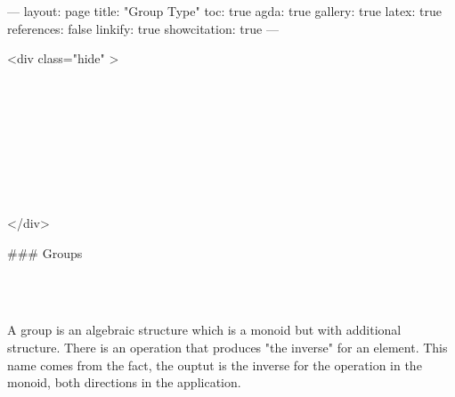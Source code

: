 ---
layout: page
title: "Group Type"
toc: true
agda: true
gallery: true
latex: true
references: false
linkify: true
showcitation: true
---

<div class="hide" >
\begin{code}%
\>[0]\AgdaSymbol{\{-\#}\AgdaSpace{}%
\AgdaSpace{}%
\AgdaSpace{}%
\AgdaSymbol{\#-\}}\<%
\\
\>[0]\AgdaSpace{}%
\AgdaSpace{}%
\<%
\\
\>[0]\AgdaSpace{}%
\AgdaSpace{}%
\<%
\\
%
\\[\AgdaEmptyExtraSkip]%
\>[0]\AgdaSpace{}%
\AgdaSpace{}%
\<%
\\
\>[0]\AgdaSpace{}%
\AgdaSpace{}%
\<%
\\
\>[0]\AgdaSpace{}%
\AgdaSpace{}%
\<%
\\
\>[0]\AgdaSpace{}%
\AgdaSpace{}%
\<%
\end{code}
</div>

### Groups

\begin{code}%
\>[0]\<%
\\
\>[0][@{}l@{\AgdaIndent{0}}]%
\>[2]\<%
\\
\>[2][@{}l@{\AgdaIndent{0}}]%
\>[4]\<%
\end{code}

A group is an algebraic structure which is a monoid but with additional structure.
There is an operation that produces "the inverse" for an element. This name
comes from the fact, the ouptut is the inverse for the operation in the monoid, both directions in the application.

